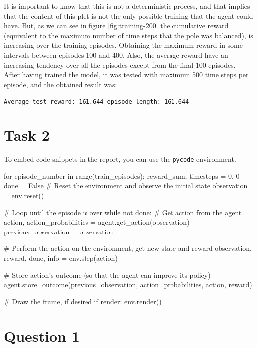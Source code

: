 \documentclass[12pt]{article}
\begin{document}
It is important to know that this is not a deterministic process, and that implies that the content of this plot is not the only possible training that the agent could have. But, as we can see in figure \ref{fig:training-200} the cumulative reward (equivalent to the maximum number of time steps that the pole was balanced), is increasing over the training episodes. Obtaining the maximum reward in some intervals between episodes 100 and 400. Also, the average reward have an increasing tendency over all the episodes except from the final 100 episodes. \\

After having trained the model, it was tested with maximum 500 time steps per episode, and the obtained result was:

\begin{center}
    \texttt{Average test reward: 161.644 episode length: 161.644}
\end{center}


\section{Task 2}
To embed code snippets in the report, you can use the \texttt{pycode} environment.

\begin{pycode}
for episode_number in range(train_episodes):
    reward_sum, timesteps = 0, 0
    done = False
    # Reset the environment and observe the initial state
    observation = env.reset()

    # Loop until the episode is over
    while not done:
        # Get action from the agent
        action, action_probabilities = agent.get_action(observation)
        previous_observation = observation

        # Perform the action on the environment, get new state and reward
        observation, reward, done, info = env.step(action)

        # Store action's outcome (so that the agent can improve its policy)
        agent.store_outcome(previous_observation, action_probabilities, action, reward)

        # Draw the frame, if desired
        if render:
            env.render()
\end{pycode}

\section{Question 1}
\end{document}
